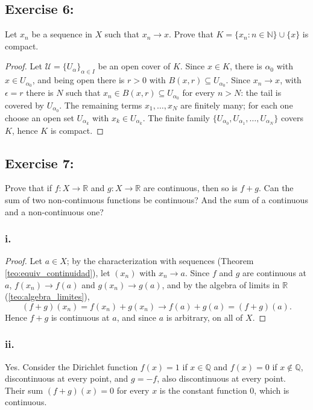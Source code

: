 \documentclass[11pt, a4paper]{article}
\begin{document}
\subsection*{Exercise 6:}

Let $x_n$ be a sequence in $X$ such that $x_n \to x$. Prove that
$K = \{x_n : n \in \mathbb{N}\} \cup \{x\}$ is compact.

\begin{proof}
Let $\mathcal{U} = \{U_\alpha\}_{\alpha \in I}$ be an open cover of $K$. Since $x \in K$, there is
$\alpha_0$ with $x \in U_{\alpha_0}$, and being open there is $r > 0$ with
$B(x, r) \subseteq U_{\alpha_0}$. Since $x_n \to x$, with $\epsilon = r$ there is $N$ such that
$x_n \in B(x, r) \subseteq U_{\alpha_0}$ for every $n > N$: the tail is covered by
$U_{\alpha_0}$. The remaining terms $x_1, \dots, x_N$ are finitely many; for each one choose an
open set $U_{\alpha_k}$ with $x_k \in U_{\alpha_k}$. The finite family
$\{U_{\alpha_0}, U_{\alpha_1}, \dots, U_{\alpha_N}\}$ covers $K$, hence $K$ is compact.
\end{proof}

\subsection*{Exercise 7:}

Prove that if $f: X \to \mathbb{R}$ and $g: X \to \mathbb{R}$ are continuous, then so is $f+g$.
Can the sum of two non-continuous functions be continuous?
And the sum of a continuous and a non-continuous one?

\subsubsection*{i.}
\begin{proof}
Let $a \in X$; by the characterization with sequences (Theorem \ref{teo:equiv_continuidad}), let
$(x_n)$ with $x_n \to a$. Since $f$ and $g$ are
continuous at $a$, $f(x_n) \to f(a)$ and $g(x_n) \to g(a)$, and by the algebra of limits in $\mathbb{R}$
(\ref{teo:algebra_limites}),
$$ (f+g)(x_n) = f(x_n) + g(x_n) \to f(a) + g(a) = (f+g)(a). $$
Hence $f+g$ is continuous at $a$, and since $a$ is arbitrary, on all of $X$.
\end{proof}

\subsubsection*{ii.}
Yes. Consider the Dirichlet function $f(x) = 1$ if $x \in \mathbb{Q}$ and $f(x) = 0$ if
$x \notin \mathbb{Q}$, discontinuous at every point, and $g = -f$, also discontinuous at every point. Their
sum $(f+g)(x) = 0$ for every $x$ is the constant function $0$, which is continuous.
\end{document}
